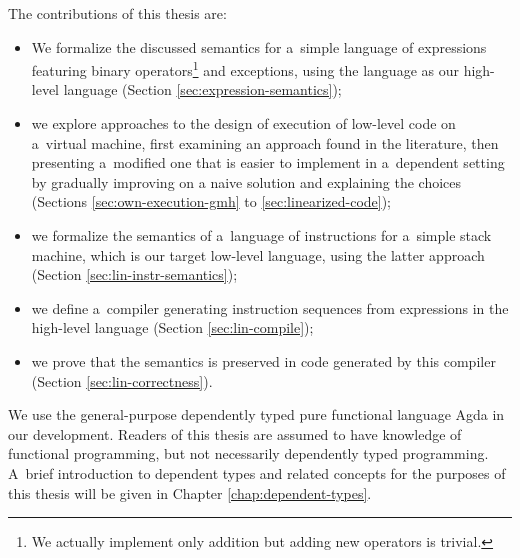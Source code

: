 \noindent The contributions of this thesis are:
\begin{itemize}
	\item We formalize the discussed semantics for a~simple language of expressions
		featuring binary operators\footnote{We actually implement only addition but adding new
		operators is trivial.} and exceptions, using the language as our high-level language
		(Section \ref{sec:expression-semantics});
	\item we explore approaches to the design of execution of low-level code on a~virtual
		machine, first examining an approach found in the
		literature, then presenting a~modified one that is easier to implement in a~dependent
		setting by gradually improving on a naive solution and explaining the choices
		(Sections \ref{sec:own-execution-gmh} to \ref{sec:linearized-code});
	\item we formalize the semantics of a~language of instructions for a~simple stack machine,
		which is our target low-level language, using the latter approach
		(Section \ref{sec:lin-instr-semantics});
	\item we define a~compiler generating instruction sequences from expressions in the high-level
		language (Section \ref{sec:lin-compile});
	\item we prove that the semantics is preserved in code generated by this compiler
		(Section \ref{sec:lin-correctness}).
\end{itemize}

\noindent We use the general-purpose dependently typed pure functional language Agda in
our development.
Readers of this thesis are assumed to have knowledge of functional programming, but
not necessarily dependently typed programming. A~brief introduction to dependent types and
related concepts for the purposes of this thesis will be given in Chapter \ref{chap:dependent-types}.
